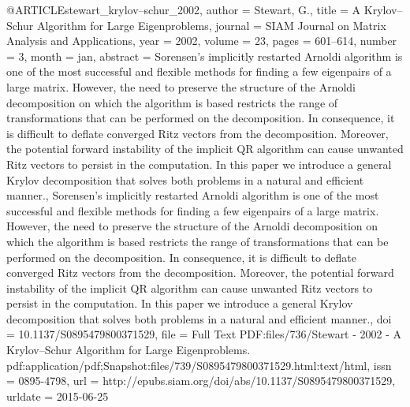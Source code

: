 @ARTICLE{stewart_krylov--schur_2002,
  author = {Stewart, G.},
  title = {A {Krylov}--{Schur} {Algorithm} for {Large} {Eigenproblems}},
  journal = {SIAM Journal on Matrix Analysis and Applications},
  year = {2002},
  volume = {23},
  pages = {601--614},
  number = {3},
  month = jan,
  abstract = {Sorensen's implicitly restarted Arnoldi algorithm is one of the most
	successful and flexible methods for finding a few eigenpairs of a
	large matrix. However, the need to preserve the structure of the
	Arnoldi decomposition on which the algorithm is based restricts the
	range of transformations that can be performed on the decomposition.
	In consequence, it is difficult to deflate converged Ritz vectors
	from the decomposition. Moreover, the potential forward instability
	of the implicit QR algorithm can cause unwanted Ritz vectors to persist
	in the computation. In this paper we introduce a general Krylov decomposition
	that solves both problems in a natural and efficient manner., Sorensen's
	implicitly restarted Arnoldi algorithm is one of the most successful
	and flexible methods for finding a few eigenpairs of a large matrix.
	However, the need to preserve the structure of the Arnoldi decomposition
	on which the algorithm is based restricts the range of transformations
	that can be performed on the decomposition. In consequence, it is
	difficult to deflate converged Ritz vectors from the decomposition.
	Moreover, the potential forward instability of the implicit QR algorithm
	can cause unwanted Ritz vectors to persist in the computation. In
	this paper we introduce a general Krylov decomposition that solves
	both problems in a natural and efficient manner.},
  doi = {10.1137/S0895479800371529},
  file = {Full Text PDF:files/736/Stewart - 2002 - A Krylov--Schur Algorithm for Large Eigenproblems.   pdf:application/pdf;Snapshot:files/739/S0895479800371529.html:text/html},
  issn = {0895-4798},
  url = {http://epubs.siam.org/doi/abs/10.1137/S0895479800371529},
  urldate = {2015-06-25}
}

